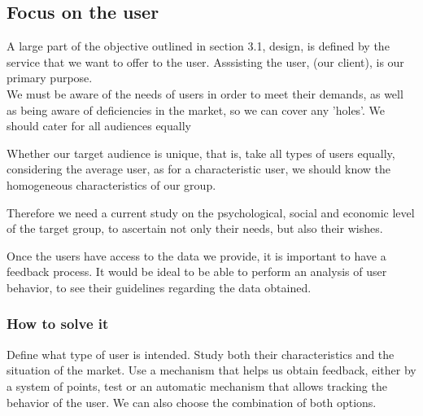 \subsection{Focus on the user}
A large part of the objective outlined in section 3.1, design, is defined by the service that we want to offer
to the user. Asssisting the user, (our client), is our primary purpose. \\


We must be aware of the needs of users in order to meet their demands, as well as being aware of deficiencies in the market, so we can cover any 'holes'.
We should cater for all audiences equally 

Whether our target audience is unique, that is, take all types of users equally, considering the
average user, as for a characteristic user, we should know the homogeneous characteristics of our group.

Therefore we need a current study on the psychological, social and economic level of the target group, to ascertain not only
their needs, but also their wishes.

Once the users have access to the data we provide, it is important to have a feedback process.
It would be ideal to be able to perform an analysis of user behavior, to see their guidelines regarding the data obtained.
\subsubsection{How to solve it} 
Define what type of user is intended. Study both their characteristics and the situation of the
market.
Use a mechanism that helps us obtain feedback, either by a system of points, test or
an automatic mechanism that allows tracking the behavior of the user. We can also choose the combination of both
options.

